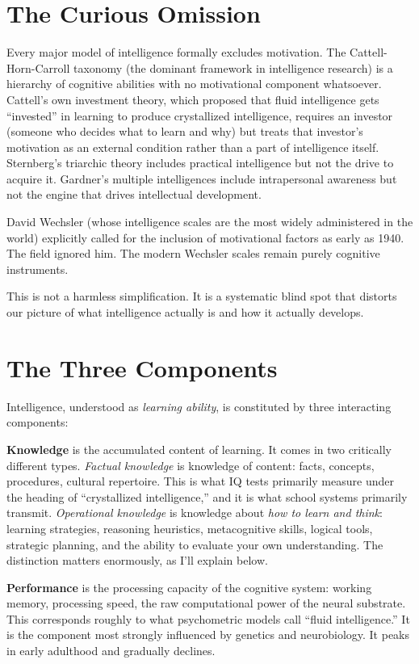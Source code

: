 \documentclass[11pt, twoside, openright]{book}
\begin{document}
\section*{The Curious Omission}

Every major model of intelligence formally excludes motivation. The Cattell-Horn-Carroll taxonomy (the dominant framework in intelligence research) is a hierarchy of cognitive abilities with no motivational component whatsoever. Cattell's own investment theory, which proposed that fluid intelligence gets ``invested'' in learning to produce crystallized intelligence, requires an investor (someone who decides what to learn and why) but treats that investor's motivation as an external condition rather than a part of intelligence itself. Sternberg's triarchic theory includes practical intelligence but not the drive to acquire it. Gardner's multiple intelligences include intrapersonal awareness but not the engine that drives intellectual development.

David Wechsler (whose intelligence scales are the most widely administered in the world) explicitly called for the inclusion of motivational factors as early as 1940. The field ignored him. The modern Wechsler scales remain purely cognitive instruments.

This is not a harmless simplification. It is a systematic blind spot that distorts our picture of what intelligence actually is and how it actually develops.

\section*{The Three Components}

Intelligence, understood as \textit{learning ability}, is constituted by three interacting components:

\textbf{Knowledge} is the accumulated content of learning. It comes in two critically different types. \textit{Factual knowledge} is knowledge of content: facts, concepts, procedures, cultural repertoire. This is what IQ tests primarily measure under the heading of ``crystallized intelligence,'' and it is what school systems primarily transmit. \textit{Operational knowledge} is knowledge about \textit{how to learn and think}: learning strategies, reasoning heuristics, metacognitive skills, logical tools, strategic planning, and the ability to evaluate your own understanding. The distinction matters enormously, as I'll explain below.

\textbf{Performance} is the processing capacity of the cognitive system: working memory, processing speed, the raw computational power of the neural substrate. This corresponds roughly to what psychometric models call ``fluid intelligence.'' It is the component most strongly influenced by genetics and neurobiology. It peaks in early adulthood and gradually declines.
\end{document}
